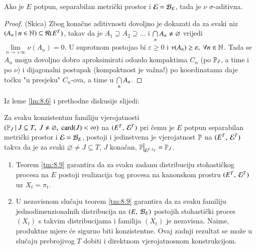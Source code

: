 \begin{lm}  \label{lm:8.6}
    Ako je $E$ potpun, separabilan metri\v cki prostor i $\mathcal{E} = \mathcal{B}_{E}$, tada je $\nu$ $\sigma$-aditivna.
\end{lm}

\begin{proof}{(Skica)}
    Zbog kona\v cne aditivnosti dovoljno je dokazati da za svaki niz $({A_n} \: | \: {n \in \mathbb{N}}) \subseteq \mathcal{R}({E^T})$, takav da je
    $A_1 \supseteq A_2 \supseteq \ldots$ i $\bigcap\limits_{n}^{} A_n \neq \varnothing$ vrijedi $\lim\limits_{n \to +\infty} \nu (A_n) = 0$.
    U suprotnom postojao bi $\varepsilon \geq 0$ i $\nu (A_n) \geq \varepsilon, \; \forall n \in \mathbb{N}$.
    Tada se $A_n$ mogu dovoljno dobro aproksimirati odozdo kompaktima $C_n$ (po $\mathbb{P}_J$, a time i po $\nu$) i dijagonalni postupak (kompaktnost je va\v zna!) po koordinatama daje to\v cku "u presjeku" $C_n$-ova, a time u $\bigcap\limits_{n}^{} A_n$.
\end{proof}

Iz leme \ref{lm:8.6} i prethodne diskusije slijedi:

\begin{tm}[Kolmogorov]    \label{tm:8.9}
    Za svaku konzistentnu familiju vjerojatnosti\\
    $({\mathbb{P}_J} \: | \: {J \subseteq T, \; J \neq \varnothing, \; \textnormal{card}({J}) < \infty})$ na $({E^T}, \: {\mathcal{E}^T})$ pri \v cemu je $E$ potpun separabilan metri\v cki prostor i $\mathcal{E} = \mathcal{B}_{E}$, postoji i jedinstvena je vjerojatnost $\mathbb{P}$ na $({E^T}, \: {\mathcal{E}^T})$ takva da je za svaki $\varnothing \neq J \subseteq T$, $J$ kona\v can, $\restr{\masP}{\famE^{T, \: \pi_J}} = \masP_J$.
\end{tm}

\begin{nap} \label{nap:8.10}
    \begin{enumerate}[label=(\alph*)]
        \item Teorem \ref{tm:8.9} garantira da za svaku zadanu distribuciju stohasti\v ckog procesa na $E$ postoji realizacija tog procesa na kanonskom prostru $({E^T}, \: {\mathcal{E}^T})$ uz $X_t = \pi_t$.
        \item U nezavisnom slu\v caju teorem \ref{tm:8.9} garantira da za svaku familiju jednodimenzionalnih distribucija na $({E}, \: {\mathcal{B}_{E}})$ postojih stohasti\v cki proces $(X_t)$ s takvim distribucijama i familija $(X_t)$ je nezavisna.
        Naime, produktne mjere \' ce sigurno biti konzistentne.
        Ovaj zadnji rezultat se mo\v ze u slu\v caju prebrojivog $T$ dobiti i direktnom vjerojatnosnom konstrukcijom.
    \end{enumerate}
\end{nap}

